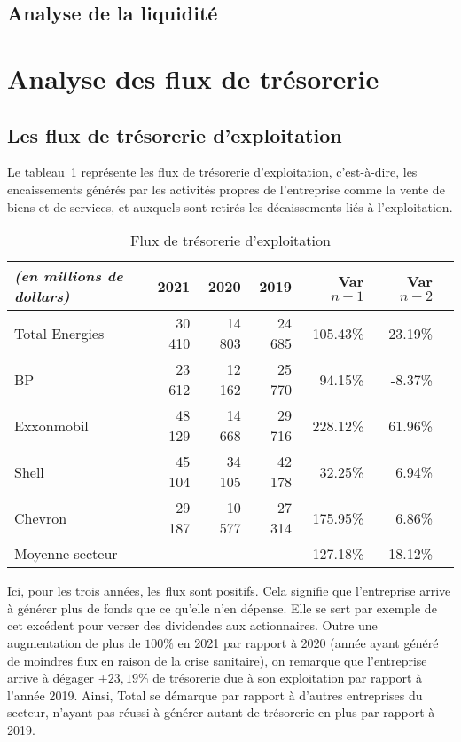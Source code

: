 \documentclass[12pt]{article}
\begin{document}
\subsection{Analyse de la liquidité}

\newpage
\section{Analyse des flux de trésorerie}
\subsection{Les flux de trésorerie d'exploitation}
Le tableau~\ref{table:fluxActivite} représente les flux de trésorerie d'exploitation, c'est-à-dire, les encaissements générés par les activités propres de l'entreprise comme la vente de biens et de services, et auxquels sont retirés les décaissements liés à l'exploitation.
\begin{table}[H]
    \sffamily
    \centering
    \caption{Flux de trésorerie d'exploitation}
    \label{table:fluxActivite}
    \begin{tabular}{l*{1}{rrrrrr}}
        \toprule
        \textit{(en millions de dollars)} & \textbf{2021} & 2020 & 2019 & Var $n-1$ & Var $n-2$ \\
        \midrule
        Total Energies & 30 410 & 14 803 & 24 685 & 105.43\% & 23.19\% \\ 
        \midrule
        BP & 23 612 & 12 162 & 25 770 & 94.15\% & -8.37\% \\ 
        Exxonmobil & 48 129 & 14 668 & 29 716 & 228.12\% & 61.96\% \\ 
        Shell & 45 104 & 34 105 & 42 178 & 32.25\% & 6.94\% \\ 
        Chevron & 29 187 & 10 577 & 27 314 & 175.95\% & 6.86\% \\ 
    \midrule
        Moyenne secteur & ~ & ~ & ~ & 127.18\% & 18.12\% \\
    \bottomrule
    \end{tabular}
\end{table}
Ici, pour les trois années, les flux sont positifs. Cela signifie que l'entreprise arrive à générer plus de fonds que ce qu'elle n'en dépense. Elle se sert par exemple de cet excédent pour verser des dividendes aux actionnaires. Outre une augmentation de plus de $100\%$ en 2021 par rapport à 2020 (année ayant généré de moindres flux en raison de la crise sanitaire), on remarque que l'entreprise arrive à dégager $+23,19\%$ de trésorerie due à son exploitation par rapport à l'année 2019. Ainsi, Total se démarque par rapport à d'autres entreprises du secteur, n'ayant pas réussi à générer autant de trésorerie en plus par rapport à 2019.
\end{document}
